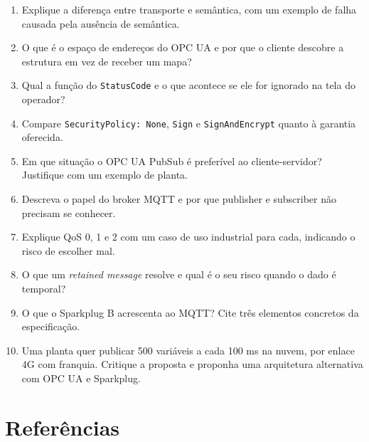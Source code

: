\begin{enumerate}
\def\labelenumi{\arabic{enumi}.}
\tightlist
\item
  Explique a diferença entre transporte e semântica, com um exemplo de falha causada pela ausência de semântica.
\item
  O que é o espaço de endereços do OPC UA e por que o cliente descobre a estrutura em vez de receber um mapa?
\item
  Qual a função do \passthrough{\lstinline!StatusCode!} e o que acontece se ele for ignorado na tela do operador?
\item
  Compare \passthrough{\lstinline!SecurityPolicy: None!}, \passthrough{\lstinline!Sign!} e \passthrough{\lstinline!SignAndEncrypt!} quanto à garantia oferecida.
\item
  Em que situação o OPC UA PubSub é preferível ao cliente-servidor? Justifique com um exemplo de planta.
\item
  Descreva o papel do broker MQTT e por que publisher e subscriber não precisam se conhecer.
\item
  Explique QoS 0, 1 e 2 com um caso de uso industrial para cada, indicando o risco de escolher mal.
\item
  O que um \emph{retained message} resolve e qual é o seu risco quando o dado é temporal?
\item
  O que o Sparkplug B acrescenta ao MQTT? Cite três elementos concretos da especificação.
\item
  Uma planta quer publicar 500 variáveis a cada 100 ms na nuvem, por enlace 4G com franquia. Critique a proposta e proponha uma arquitetura alternativa com OPC UA e Sparkplug.
\end{enumerate}

\section{Referências}\label{referuxeancias}

